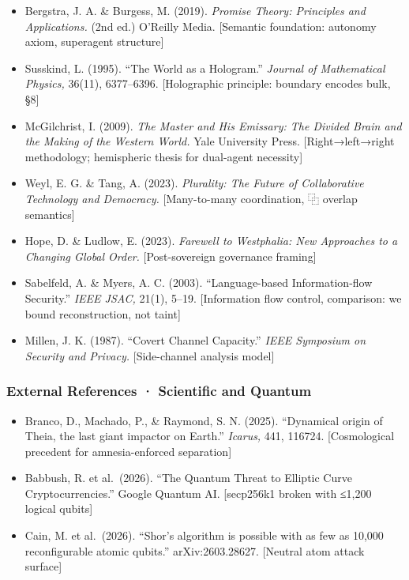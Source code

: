 \documentclass[
  11pt,
]{article}
\providecommand{\tightlist}{%
  \setlength{\itemsep}{0pt}\setlength{\parskip}{0pt}}
\begin{document}
\begin{itemize}
\tightlist
\item
  Bergstra, J. A. \& Burgess, M. (2019). \emph{Promise Theory:
  Principles and Applications.} (2nd ed.) O'Reilly Media. {[}Semantic
  foundation: autonomy axiom, superagent structure{]}
\item
  Susskind, L. (1995). ``The World as a Hologram.'' \emph{Journal of
  Mathematical Physics,} 36(11), 6377--6396. {[}Holographic principle:
  boundary encodes bulk, §8{]}
\item
  McGilchrist, I. (2009). \emph{The Master and His Emissary: The Divided
  Brain and the Making of the Western World.} Yale University Press.
  {[}Right→left→right methodology; hemispheric thesis for dual-agent
  necessity{]}
\item
  Weyl, E. G. \& Tang, A. (2023). \emph{Plurality: The Future of
  Collaborative Technology and Democracy.} {[}Many-to-many coordination,
  ⿻ overlap semantics{]}
\item
  Hope, D. \& Ludlow, E. (2023). \emph{Farewell to Westphalia: New
  Approaches to a Changing Global Order.} {[}Post-sovereign governance
  framing{]}
\item
  Sabelfeld, A. \& Myers, A. C. (2003). ``Language-based
  Information-flow Security.'' \emph{IEEE JSAC,} 21(1), 5--19.
  {[}Information flow control, comparison: we bound reconstruction, not
  taint{]}
\item
  Millen, J. K. (1987). ``Covert Channel Capacity.'' \emph{IEEE
  Symposium on Security and Privacy.} {[}Side-channel analysis model{]}
\end{itemize}

\subsubsection{External References · Scientific and
Quantum}\label{external-references-scientific-and-quantum}

\begin{itemize}
\tightlist
\item
  Branco, D., Machado, P., \& Raymond, S. N. (2025). ``Dynamical origin
  of Theia, the last giant impactor on Earth.'' \emph{Icarus,} 441,
  116724. {[}Cosmological precedent for amnesia-enforced separation{]}
\item
  Babbush, R. et al.~(2026). ``The Quantum Threat to Elliptic Curve
  Cryptocurrencies.'' Google Quantum AI. {[}secp256k1 broken with ≤1,200
  logical qubits{]}
\item
  Cain, M. et al.~(2026). ``Shor's algorithm is possible with as few as
  10,000 reconfigurable atomic qubits.'' arXiv:2603.28627. {[}Neutral
  atom attack surface{]}
\end{itemize}
\end{document}
